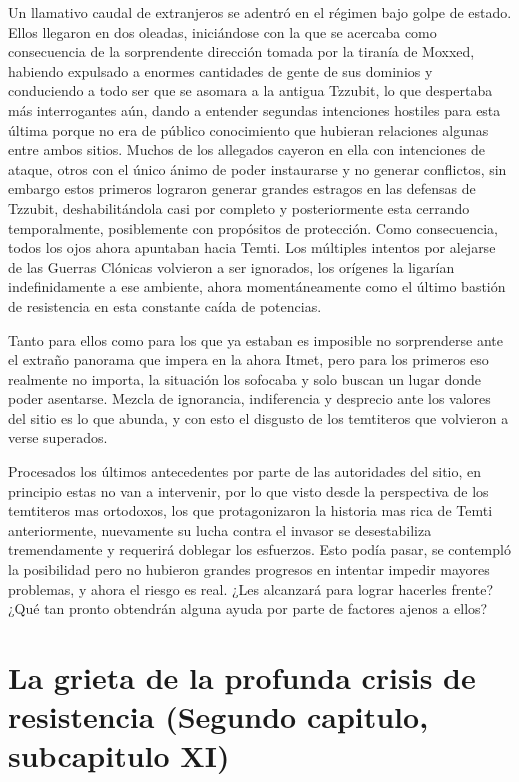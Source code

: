 \documentclass[
  spanish,
]{book}
\begin{document}
Un llamativo caudal de extranjeros se adentró en el régimen bajo golpe de estado. Ellos llegaron en dos oleadas, iniciándose con la que se acercaba como consecuencia de la sorprendente dirección tomada por la tiranía de Moxxed, habiendo expulsado a enormes cantidades de gente de sus dominios y conduciendo a todo ser que se asomara a la antigua Tzzubit, lo que despertaba más interrogantes aún, dando a entender segundas intenciones hostiles para esta última porque no era de público conocimiento que hubieran relaciones algunas entre ambos sitios.
Muchos de los allegados cayeron en ella con intenciones de ataque, otros con el único ánimo de poder instaurarse y no generar conflictos, sin embargo estos primeros lograron generar grandes estragos en las defensas de Tzzubit, deshabilitándola casi por completo y posteriormente esta cerrando temporalmente, posiblemente con propósitos de protección. Como consecuencia, todos los ojos ahora apuntaban hacia Temti. Los múltiples intentos por alejarse de las Guerras Clónicas volvieron a ser ignorados, los orígenes la ligarían indefinidamente a ese ambiente, ahora momentáneamente como el último bastión de resistencia en esta constante caída de potencias.

Tanto para ellos como para los que ya estaban es imposible no sorprenderse ante el extraño panorama que impera en la ahora Itmet, pero para los primeros eso realmente no importa, la situación los sofocaba y solo buscan un lugar donde poder asentarse. Mezcla de ignorancia, indiferencia y desprecio ante los valores del sitio es lo que abunda, y con esto el disgusto de los temtiteros que volvieron a verse superados.

Procesados los últimos antecedentes por parte de las autoridades del sitio, en principio estas no van a intervenir, por lo que visto desde la perspectiva de los temtiteros mas ortodoxos, los que protagonizaron la historia mas rica de Temti anteriormente, nuevamente su lucha contra el invasor se desestabiliza tremendamente y requerirá doblegar los esfuerzos. Esto podía pasar, se contempló la posibilidad pero no hubieron grandes progresos en intentar impedir mayores problemas, y ahora el riesgo es real. ¿Les alcanzará para lograr hacerles frente? ¿Qué tan pronto obtendrán alguna ayuda por parte de factores ajenos a ellos?

\hypertarget{la-grieta-de-la-profunda-crisis-de-resistencia-segundo-capitulo-subcapitulo-xi}{%
\section{La grieta de la profunda crisis de resistencia (Segundo capitulo, subcapitulo XI)}\label{la-grieta-de-la-profunda-crisis-de-resistencia-segundo-capitulo-subcapitulo-xi}}
\end{document}

